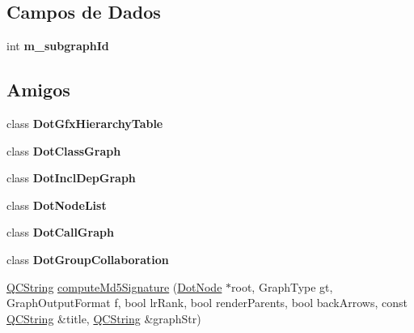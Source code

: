 \subsection*{Campos de Dados}
\begin{DoxyCompactItemize}
\item 
\hypertarget{class_dot_node_a5dbbc271a47898c250445e572a5f844f}{int {\bfseries m\-\_\-subgraph\-Id}}\label{class_dot_node_a5dbbc271a47898c250445e572a5f844f}

\end{DoxyCompactItemize}
\subsection*{Amigos}
\begin{DoxyCompactItemize}
\item 
\hypertarget{class_dot_node_a17f4bf1cb76060fb23b5d2e4d49a578c}{class {\bfseries Dot\-Gfx\-Hierarchy\-Table}}\label{class_dot_node_a17f4bf1cb76060fb23b5d2e4d49a578c}

\item 
\hypertarget{class_dot_node_aa0285f25f08e09a51d2d402e2f7f697f}{class {\bfseries Dot\-Class\-Graph}}\label{class_dot_node_aa0285f25f08e09a51d2d402e2f7f697f}

\item 
\hypertarget{class_dot_node_af4dd0198d517a07b979a10cb13a77148}{class {\bfseries Dot\-Incl\-Dep\-Graph}}\label{class_dot_node_af4dd0198d517a07b979a10cb13a77148}

\item 
\hypertarget{class_dot_node_a8782e47c20d8314fd3b24f1dc3fe081a}{class {\bfseries Dot\-Node\-List}}\label{class_dot_node_a8782e47c20d8314fd3b24f1dc3fe081a}

\item 
\hypertarget{class_dot_node_a6dc1c2df4e772dc9740f210dc2a7e522}{class {\bfseries Dot\-Call\-Graph}}\label{class_dot_node_a6dc1c2df4e772dc9740f210dc2a7e522}

\item 
\hypertarget{class_dot_node_a32f81573a55b09d3b8f7d8b7ce6b2fbf}{class {\bfseries Dot\-Group\-Collaboration}}\label{class_dot_node_a32f81573a55b09d3b8f7d8b7ce6b2fbf}

\item 
\hyperlink{class_q_c_string}{Q\-C\-String} \hyperlink{class_dot_node_a884f8a9fb5f3d91efe1b967011f8f98c}{compute\-Md5\-Signature} (\hyperlink{class_dot_node}{Dot\-Node} $\ast$root, Graph\-Type gt, Graph\-Output\-Format f, bool lr\-Rank, bool render\-Parents, bool back\-Arrows, const \hyperlink{class_q_c_string}{Q\-C\-String} \&title, \hyperlink{class_q_c_string}{Q\-C\-String} \&graph\-Str)
\end{DoxyCompactItemize}


